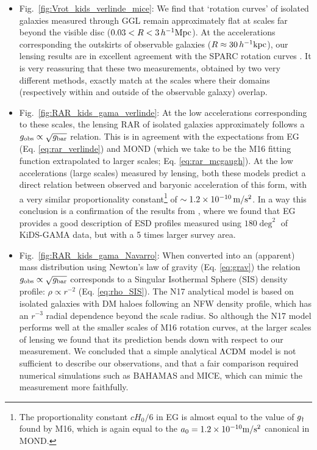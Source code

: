 \documentclass[usenatbib]{mnras}
\newcommand{\hkpc}{\, h^{-1}{\rm{kpc}} }
\newcommand{\hMpc}{\, h^{-1}{\rm{Mpc}} }
\newcommand{\mpss}{ {\rm m/s^2} }
\newcommand{\lcdm}{{\rm \Lambda CDM}}
\newcommand*{\E}[1]{\times 10^{#1}}
\newcommand{\un}[1]{_{\rm #1}}
\begin{document}
\begin{itemize}

	\item Fig.~\ref{fig:Vrot_kids_verlinde_mice}: We find that `rotation curves' of isolated galaxies measured through GGL remain approximately flat at scales far beyond the visible disc ($0.03 < R < 3 \hMpc$). At the accelerations corresponding the outskirts of observable galaxies ($R \approx 30\hkpc$), our lensing results are in excellent agreement with the SPARC rotation curves \cite[]{lelli2016b}. It is very reassuring that these two measurements, obtained by two very different methods, exactly match at the scales where their domains (respectively within and outside of the observable galaxy) overlap.
	
	\item Fig.~\ref{fig:RAR_kids_gama_verlinde}: At the low accelerations corresponding to these scales, the lensing RAR of isolated galaxies approximately follows a $g\un{obs} \propto \sqrt{g\un{bar}}$ relation. This is in agreement with the expectations from EG (Eq. \ref{eq:rar_verlinde}) and MOND (which we take to be the M16 fitting function extrapolated to larger scales; Eq. \ref{eq:rar_mcgaugh}). At the low accelerations (large scales) measured by lensing, both these models predict a direct relation between observed and baryonic acceleration of this form, with a very similar proportionality constant\footnote{The proportionality constant $c H_0 / 6$ in EG is almost equal to the value of $g\un{\dagger}$ found by M16, which is again equal to the $a_0=1.2\E{-10} \mpss$ canonical in MOND.} of $\sim1.2\E{-10} \, \mpss$. In a way this conclusion is a confirmation of the results from \cite{brouwer2017}, where we found that EG provides a good description of ESD profiles measured using $180 \deg^2$ of KiDS-GAMA data, but with a 5 times larger survey area.
	
	\item Fig.~\ref{fig:RAR_kids_gama_Navarro}: When converted into an (apparent) mass distribution using Newton's law of gravity (Eq. \ref{eq:grav}) the relation $g\un{obs} \propto \sqrt{g\un{bar}}$ corresponds to a Singular Isothermal Sphere (SIS) density profile: $\rho \propto r^{-2}$ (Eq. \ref{eq:rho_SIS}). The N17 analytical model is based on isolated galaxies with DM haloes following an NFW density profile, which has an $r^{-3}$ radial dependence beyond the scale radius. So although the N17 model performs well at the smaller scales of M16 rotation curves, at the larger scales of lensing we found that its prediction bends down with respect to our measurement. We concluded that a simple analytical $\lcdm$ model is not sufficient to describe our observations, and that a fair comparison required numerical simulations such as BAHAMAS and MICE, which can mimic the measurement more faithfully.
	

\end{itemize}
\end{document}
